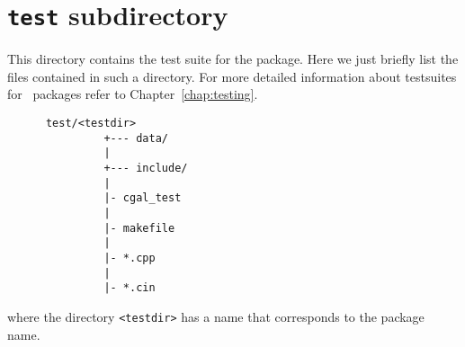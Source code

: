 \section{{\tt test} subdirectory}
\label{sec:test_subdirectory}

This directory contains the test suite for the package. Here we just
briefly list the files contained in such a directory. For more
detailed information about testsuites for \cgal\ packages refer to
Chapter~\ref{chap:testing}. 

\begin{verbatim}
      test/<testdir>
               +--- data/
               |
               +--- include/
               |
               |- cgal_test
               |
               |- makefile
               |
               |- *.cpp
               |
               |- *.cin
\end{verbatim}
where the directory \verb|<testdir>| has a name that corresponds to the package
name.

